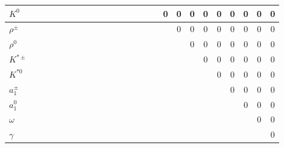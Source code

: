 \documentclass[6pt]{article}
\begin{document}
\begin{landscape}
\begin{tabular}{|l||cccc|cc|ccc|ccc|cccc|cccc|cccc|}
$K^0$  &  &  &  &  &  &  &  &  &  &  &  &  &  &  &  & 0 & 0 & 0 & 0 & 0 & 0 & 0 & 0 & 0 \\
\hline 
$\rho^{\pm}$  &  &  &  &  &  &  &  &  &  &  &  &  &  &  &  &  & 0 & 0 & 0 & 0 & 0 & 0 & 0 & 0 \\
$\rho^0$  &  &  &  &  &  &  &  &  &  &  &  &  &  &  &  &  &  & 0 & 0 & 0 & 0 & 0 & 0 & 0 \\
$K^{*\pm}$  &  &  &  &  &  &  &  &  &  &  &  &  &  &  &  &  &  &  & 0 & 0 & 0 & 0 & 0 & 0 \\
$K^{*0}$  &  &  &  &  &  &  &  &  &  &  &  &  &  &  &  &  &  &  &  & 0 & 0 & 0 & 0 & 0 \\
\hline 
$a_1^{\pm}$  &  &  &  &  &  &  &  &  &  &  &  &  &  &  &  &  &  &  &  &  & 0 & 0 & 0 & 0 \\
$a_1^0$  &  &  &  &  &  &  &  &  &  &  &  &  &  &  &  &  &  &  &  &  &  & 0 & 0 & 0 \\
$\omega$  &  &  &  &  &  &  &  &  &  &  &  &  &  &  &  &  &  &  &  &  &  &  & 0 & 0 \\
$\gamma$  &  &  &  &  &  &  &  &  &  &  &  &  &  &  &  &  &  &  &  &  &  &  &  & 0 \\
\hline \end{tabular} \end{landscape}
\end{document}
